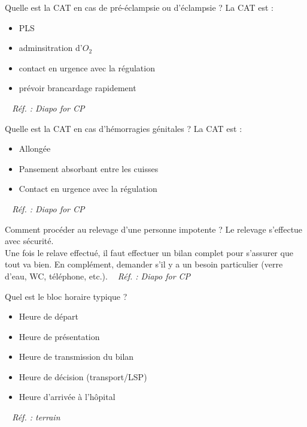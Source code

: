 \documentclass[grid,avery5371,landscape]{flashcards}
\makeatletter
\newcounter{nocarte}
\newcommand{\categ}[1]{%
  \def\@categ{#1}%
  \setcounter{nocarte}{0}%
}
\newcommand{\source}[1]{%
  \medskip
  \itshape%
   ~ \hfill Réf. : #1}
\makeatother
\begin{document}
\color[HTML]{01DF01}
\categ{CE-CP-REG}
\begin{flashcard}[CAT]{
 Quelle est la CAT en cas de pré-éclampsie ou d'éclampsie ?   }
  La CAT est :
    \begin{itemize}
        \item PLS
        \item adminsitration d'$O_2$
        \item contact en urgence avec la régulation
        \item prévoir brancardage rapidement
    \end{itemize}
  \source{Diapo for CP}
\end{flashcard}


\color[HTML]{01DF01}
\categ{CE-CP-REG}
\begin{flashcard}[CAT]{
 Quelle est la CAT en cas d'hémorragies génitales ?   }
  La CAT est :
    \begin{itemize}
        \item Allongée
        \item Pansement absorbant entre les cuisses
        \item Contact en urgence avec la régulation
    \end{itemize}
  \source{Diapo for CP}
\end{flashcard}


\color[HTML]{01DF01}
\categ{CE-CP-REG}
\begin{flashcard}[CAT]{
 Comment procéder au relevage d'une personne impotente ?   }
  Le relevage s'effectue avec sécurité. \\
    Une fois le relave effectué, il faut effectuer un bilan complet pour s'assurer que tout va bien. En complément, demander s'il y a un besoin particulier (verre d'eau, WC, téléphone, etc.).
  \source{Diapo for CP}
\end{flashcard}


\color[HTML]{01DF01}
\categ{CE-CP-REG}
\begin{flashcard}[administratif]{
 Quel est le bloc horaire typique ?   }
  \begin{itemize}        \item Heure de départ       \item Heure de présentation       \item Heure de transmission du bilan       \item Heure de décision (transport/LSP)       \item Heure d'arrivée à l'hôpital    \end{itemize}
  \source{terrain}
\end{flashcard}
\end{document}
